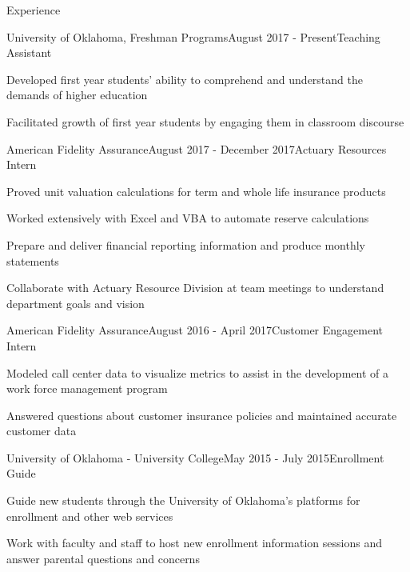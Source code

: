 \documentclass{resume} %
\begin{document}
\begin{rSection}{Experience}

\begin{rSubsection}{University of Oklahoma, Freshman Programs}{August 2017 - Present}{Teaching Assistant}{}
\item Developed first year students’ ability to comprehend and understand the demands of higher education
\item Facilitated growth of first year students by engaging them in classroom discourse
\end{rSubsection}



\begin{rSubsection}{American Fidelity Assurance}{August 2017 - December 2017}{Actuary Resources Intern}{}
\item Proved unit valuation calculations for term and whole life insurance products 
\item Worked extensively with Excel and VBA to automate reserve calculations
\item Prepare and deliver financial reporting information and produce monthly statements 
\item Collaborate with Actuary Resource Division at team meetings to understand department goals and vision
\end{rSubsection}


\begin{rSubsection}{American Fidelity Assurance}{August 2016 - April 2017}{Customer Engagement Intern}{}
\item Modeled call center data to visualize metrics to assist in the development of a work force management program 
\item Answered questions about customer insurance policies and maintained accurate customer data
\end{rSubsection}

\begin{rSubsection}{University of Oklahoma - University College}{May 2015 - July 2015}{Enrollment Guide}{}
\item Guide new students through the University of Oklahoma's platforms for enrollment and other web services
\item Work with faculty and staff to host new enrollment information sessions and answer parental questions and concerns
\end{rSubsection}


\end{rSection}
\end{document}
